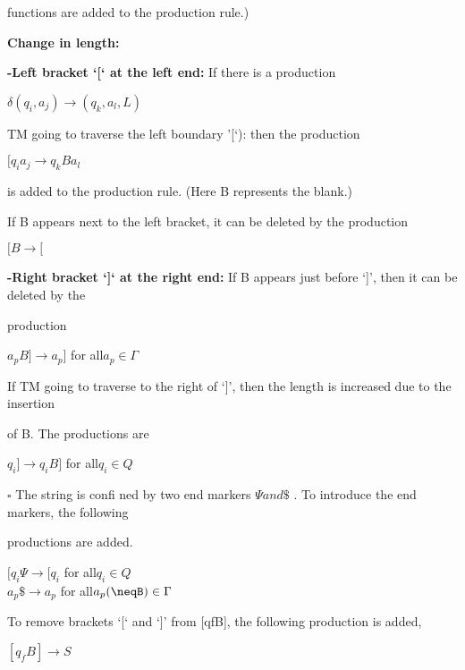 \documentclass[b5paper,10pt]{article}
\begin{document}
\qquad\quad functions are added to the production rule.)

\square \textbf{Change in length:}

\quad\textbf{ -Left bracket ‘[‘ at the left end:} If there is a production
\begin{center}
$\delta(q_i, a_j) \rightarrow (q_k, a_l, L)$\\
\end{center}
\qquad TM going to traverse the left boundary ’[‘): then the production
\begin{center}
$[q_ia_j \rightarrow q_kBa_l$\\
\end{center}
\qquad is added to the production rule. (Here B represents the blank.)

\qquad \qquad If B appears next to the left bracket, it can be deleted by the production
\begin{center}
$[B \rightarrow [$\\
\end{center}
\quad\textbf{ -Right bracket ‘]‘ at the right end:} If B appears just before ‘]’, then it can be deleted by the

\quad production
\begin{center}
$a_pB] \rightarrow a_p] $ for all$ a_p\in \Gamma$\\
\end{center}
\qquad\qquad If TM going to traverse to the right of ‘]’, then the length is increased due to the insertion

\qqaud \quad of B. The productions are
\begin{center}
$q_i] \rightarrow q_iB] $ for all$ q_i \in Q$\\
\end{center}

$\square$ The string is confi ned by two end markers $\Psi and \$ $ . To introduce the end markers, the following

productions are added.
\begin{center}
$[q_i \Psi \rightarrow [q_i $ for all$ q_i \in Q$\\
$a_p\$ \rightarrow a_p $ for all$ a_p (\neqB) \in \Gamma$
\end{center}

\quad To remove brackets ‘[‘ and ‘]’ from [qfB], the following production is added,
\begin{center}
$[q_fB] \rightarrow S$\\
\end{center}
\end{document}
